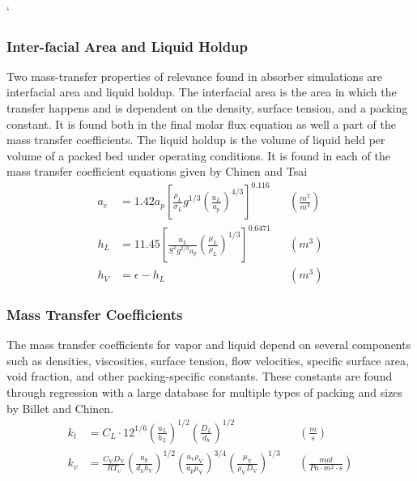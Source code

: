 \documentclass[12pt, letterpaper]{article}
\begin{document}
            `\subsubsection{Inter-facial Area and Liquid Holdup}
            
                Two mass-transfer properties of relevance found in absorber simulations are interfacial area and liquid holdup.
                The interfacial area is the area in which the transfer happens and is dependent on the density, surface tension, and a packing constant.
                It is found both in the final molar flux equation as well a part of the mass transfer coefficients.
                The liquid holdup is the volume of liquid held per volume of a packed bed under operating conditions.
                It is found in each of the mass transfer coefficient equations given by Chinen and Tsai~\cite{SoaresChinen2018DevelopmentQuantification,Tsai2010MassPacking}
                \begin{align}
                    a_e &=1.42 a_p\left[\frac{\rho_L}{\sigma_L} g^{1 / 3}\left(\frac{u_L}{a_p}\right)^{4 / 3}\right]^{0.116} && \left(\frac{\unit{m}^2}{\unit{m}^3} \right) \\
                    h_L &= 11.45\left[\frac{u_L}{S^2 g^{2 / 3} a_p}\left(\frac{\mu_L}{\rho_L}\right)^{1 / 3}\right]^{0.6471} && \left(\unit{m}^3 \right)\\
                    h_V &= \epsilon - h_L && \left(\unit{m}^3 \right)
                \end{align}

            \subsubsection{Mass Transfer Coefficients}
            
                The mass transfer coefficients for vapor and liquid depend on several components such as densities, viscosities, surface tension, flow velocities, specific surface area, void fraction, and other packing-specific constants.
                These constants are found through regression with a large database for multiple types of packing and sizes by Billet and Chinen\cite{Billet1999PredictionPackings, SoaresChinen2018DevelopmentQuantification}.
                \begin{align}
                    k_l &= C_L \cdot 12^{1 / 6}\left(\frac{u_L}{h_L}\right)^{1 / 2}\left(\frac{D_L}{d_h}\right)^{1 / 2} && \left(\frac{\unit{m} }{\unit{s}} \right)\\
                    k_v &=\frac{C_{\mathrm{V}}D_{\mathrm{V}}}{RT_v} \left(\frac{a_p}{d_h h_V}\right)^{1/2}  \left(\frac{u_{\mathrm{v}} \rho_{\mathrm{V}}}{a_p \mu_{\mathrm{V}}}\right)^{3 / 4}\left(\frac{\mu_{\mathrm{V}}}{\rho_{\mathrm{V}} D_{\mathrm{V}}}\right)^{1 / 3} && \left(\frac{\unit{mol} }{\unit{Pa} \cdot{m}^2 \cdot \unit{s}} \right)
                \end{align}
            
\end{document}
